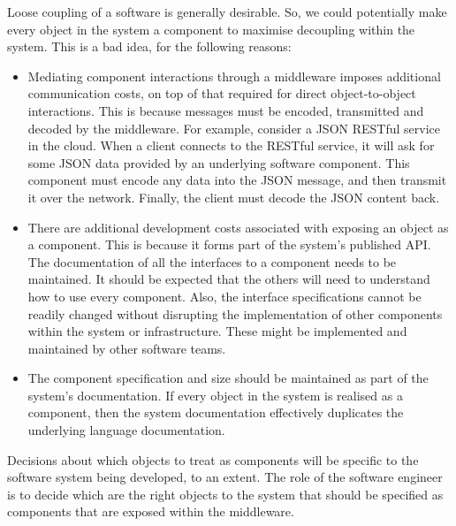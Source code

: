 \documentclass[a4paper, openany]{memoir}
\begin{document}
Loose coupling of a software is generally desirable. So, we could potentially make every object in the system a component to maximise decoupling within the system. This is a bad idea, for the following reasons:
\begin{itemize}
    \item Mediating component interactions through a middleware imposes additional communication costs, on top of that required for direct object-to-object interactions. This is because messages must be encoded, transmitted and decoded by the middleware. For example, consider a JSON RESTful service in the cloud. When a client connects to the RESTful service, it will ask for some JSON data provided by an underlying software component. This component must encode any data into the JSON message, and then transmit it over the network. Finally, the client must decode the JSON content back.
    
    \item There are additional development costs associated with exposing an object as a component. This is because it forms part of the system's published API. The documentation of all the interfaces to a component needs to be maintained. It should be expected that the others will need to understand how to use every component. Also, the interface specifications cannot be readily changed without disrupting the implementation of other components within the system or infrastructure. These might be implemented and maintained by other software teams.
    
    \item The component specification and size should be maintained as part of the system's documentation. If every object in the system is realised as a component, then the system documentation effectively duplicates the underlying language documentation.
\end{itemize}
Decisions about which objects to treat as components will be specific to the software system being developed, to an extent. The role of the software engineer is to decide which are the right objects to the system that should be specified as components that are exposed within the middleware.
\end{document}
